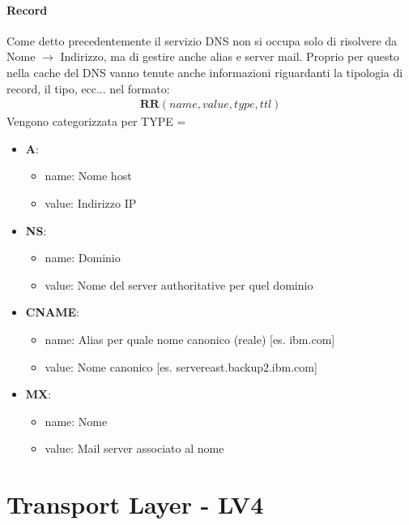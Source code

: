 \documentclass[12pt]{article}
\begin{document}
\paragraph{Record} Come detto precedentemente il servizio DNS non si occupa solo di risolvere da Nome $\rightarrow$ Indirizzo, ma di gestire anche alias e server mail. Proprio per questo nella cache del DNS vanno tenute anche informazioni riguardanti la tipologia di record, il tipo, ecc... nel formato:
\begin{equation}
  \begin{gathered}
    \textbf{RR}(name, value, type, ttl)
  \end{gathered}
\end{equation}
Vengono categorizzata per TYPE =
\begin{itemize}
  \item \textbf{A}:
  \begin{itemize}
    \item name: Nome host
    \item value: Indirizzo IP
  \end{itemize}
  \item \textbf{NS}:
  \begin{itemize}
    \item name: Dominio
    \item value: Nome del server authoritative per quel dominio
  \end{itemize}
  \item \textbf{CNAME}:
  \begin{itemize}
    \item name: Alias per quale nome canonico (reale) [es. ibm.com]
    \item value: Nome canonico [es. servereast.backup2.ibm.com]
  \end{itemize}
  \item \textbf{MX}:
  \begin{itemize}
    \item name: Nome
    \item value: Mail server associato al nome
  \end{itemize}
\end{itemize}

\section{Transport Layer - LV4} \label{LV4} %
\end{document}
